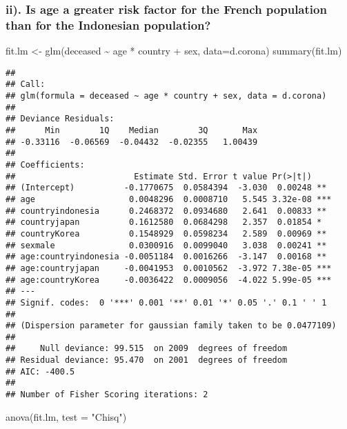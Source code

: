 \documentclass[
]{article}
\newenvironment{Shaded}{\begin{snugshade}}{\end{snugshade}}
\newcommand{\AttributeTok}[1]{\textcolor[rgb]{0.77,0.63,0.00}{#1}}
\newcommand{\FunctionTok}[1]{\textcolor[rgb]{0.00,0.00,0.00}{#1}}
\newcommand{\NormalTok}[1]{#1}
\newcommand{\OtherTok}[1]{\textcolor[rgb]{0.56,0.35,0.01}{#1}}
\newcommand{\SpecialCharTok}[1]{\textcolor[rgb]{0.00,0.00,0.00}{#1}}
\newcommand{\StringTok}[1]{\textcolor[rgb]{0.31,0.60,0.02}{#1}}
\begin{document}
\hypertarget{ii.-is-age-a-greater-risk-factor-for-the-french-population-than-for-the-indonesian-population}{%
\subsubsection{ii). Is age a greater risk factor for the French
population than for the Indonesian
population?}\label{ii.-is-age-a-greater-risk-factor-for-the-french-population-than-for-the-indonesian-population}}

\begin{Shaded}
\begin{Highlighting}[]
\NormalTok{fit.lm }\OtherTok{\textless{}{-}} \FunctionTok{glm}\NormalTok{(deceased }\SpecialCharTok{\textasciitilde{}}\NormalTok{ age }\SpecialCharTok{*}\NormalTok{ country }\SpecialCharTok{+}\NormalTok{ sex, }\AttributeTok{data=}\NormalTok{d.corona)}
\FunctionTok{summary}\NormalTok{(fit.lm)}
\end{Highlighting}
\end{Shaded}

\begin{verbatim}
## 
## Call:
## glm(formula = deceased ~ age * country + sex, data = d.corona)
## 
## Deviance Residuals: 
##      Min        1Q    Median        3Q       Max  
## -0.33116  -0.06569  -0.04432  -0.02355   1.00439  
## 
## Coefficients:
##                        Estimate Std. Error t value Pr(>|t|)    
## (Intercept)          -0.1770675  0.0584394  -3.030  0.00248 ** 
## age                   0.0048296  0.0008710   5.545 3.32e-08 ***
## countryindonesia      0.2468372  0.0934680   2.641  0.00833 ** 
## countryjapan          0.1612580  0.0684298   2.357  0.01854 *  
## countryKorea          0.1548929  0.0598234   2.589  0.00969 ** 
## sexmale               0.0300916  0.0099040   3.038  0.00241 ** 
## age:countryindonesia -0.0051184  0.0016266  -3.147  0.00168 ** 
## age:countryjapan     -0.0041953  0.0010562  -3.972 7.38e-05 ***
## age:countryKorea     -0.0036422  0.0009056  -4.022 5.99e-05 ***
## ---
## Signif. codes:  0 '***' 0.001 '**' 0.01 '*' 0.05 '.' 0.1 ' ' 1
## 
## (Dispersion parameter for gaussian family taken to be 0.0477109)
## 
##     Null deviance: 99.515  on 2009  degrees of freedom
## Residual deviance: 95.470  on 2001  degrees of freedom
## AIC: -400.5
## 
## Number of Fisher Scoring iterations: 2
\end{verbatim}

\begin{Shaded}
\begin{Highlighting}[]
\FunctionTok{anova}\NormalTok{(fit.lm, }\AttributeTok{test =} \StringTok{"Chisq"}\NormalTok{)}
\end{Highlighting}
\end{Shaded}
\end{document}
